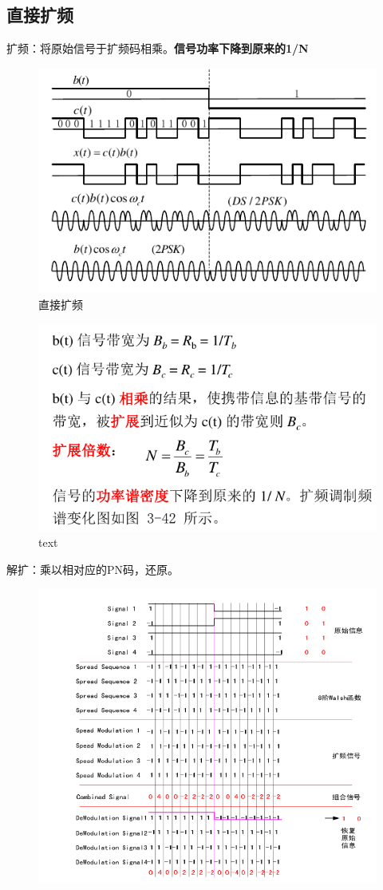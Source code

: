 \subsection{直接扩频}
扩频：将原始信号于扩频码相乘。\textbf{信号功率下降到原来的1/N}
\begin{figure}[H]
	\centering
	\includegraphics[width=0.7\linewidth]{figures/直接扩频1}
	\caption{直接扩频}
\end{figure}
\begin{figure}[H]
	\centering
	\includegraphics[width=0.7\linewidth]{figures/直接扩频2}
	\caption{text}
\end{figure}
解扩：乘以相对应的PN码，还原。
\begin{figure}[H]
	\centering
	\includegraphics[width=0.9\linewidth]{figures/screenshot002}
	\caption{}
	\label{fig:screenshot002}
\end{figure}
